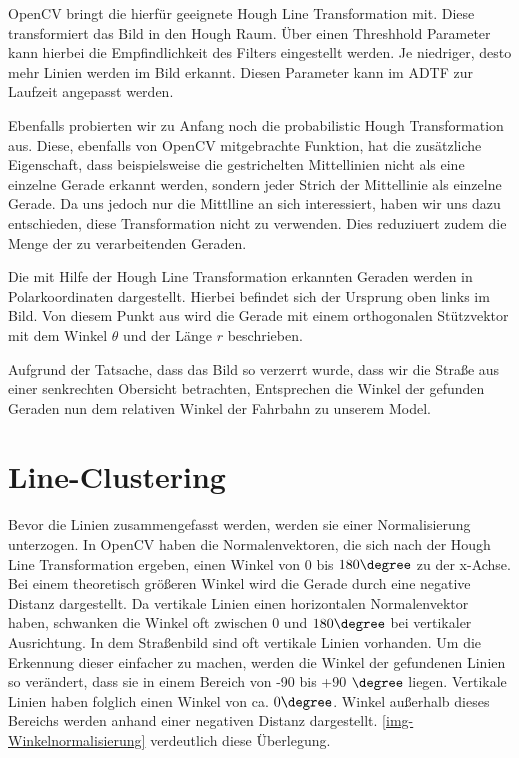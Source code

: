 \documentclass[a4paper,12pt]{report}
\begin{document}
	OpenCV bringt die hierfür geeignete Hough Line Transformation mit. Diese transformiert das Bild in den Hough Raum. Über einen Threshhold Parameter kann hierbei die Empfindlichkeit des Filters eingestellt werden. Je niedriger, desto mehr Linien werden im Bild erkannt. Diesen Parameter kann im ADTF zur Laufzeit angepasst werden.

	Ebenfalls probierten wir zu Anfang noch die probabilistic Hough Transformation aus. Diese, ebenfalls von OpenCV mitgebrachte Funktion, hat die zusätzliche Eigenschaft, dass beispielsweise die gestrichelten Mittellinien nicht als eine einzelne Gerade erkannt werden, sondern jeder Strich der Mittellinie als einzelne Gerade. Da uns jedoch nur die Mittlline an sich interessiert, haben wir uns dazu entschieden, diese Transformation nicht zu verwenden. Dies reduziuert zudem die Menge der zu verarbeitenden Geraden.

	Die mit Hilfe der Hough Line Transformation erkannten Geraden werden in Polarkoordinaten dargestellt. Hierbei befindet sich der Ursprung oben links im Bild. Von diesem Punkt aus wird die Gerade mit einem orthogonalen Stützvektor mit dem Winkel $\theta$ und der Länge $r$ beschrieben.

	Aufgrund der Tatsache, dass das Bild so verzerrt wurde, dass wir die Straße aus einer senkrechten Obersicht betrachten, Entsprechen die Winkel der gefunden Geraden nun dem relativen Winkel der Fahrbahn zu unserem Model.

\section{Line-Clustering}
	Bevor die Linien zusammengefasst werden, werden sie einer Normalisierung unterzogen. In OpenCV haben die Normalenvektoren, die sich nach der Hough Line Transformation ergeben, einen Winkel von 0 bis $180\degree$ zu der x-Achse. Bei einem theoretisch größeren Winkel wird die Gerade durch eine negative Distanz dargestellt. Da vertikale Linien einen horizontalen Normalenvektor haben, schwanken die Winkel oft zwischen 0 und $180\degree$ bei vertikaler Ausrichtung. In dem Straßenbild sind oft vertikale Linien vorhanden. Um die Erkennung dieser einfacher zu machen, werden die Winkel der gefundenen Linien so verändert, dass sie in einem Bereich von -90 bis +90 $\degree$ liegen. Vertikale Linien haben folglich einen Winkel von ca. $0 \degree$. Winkel außerhalb dieses Bereichs werden anhand einer negativen Distanz dargestellt. \autoref{img-Winkelnormalisierung} verdeutlich diese Überlegung.
\end{document}
